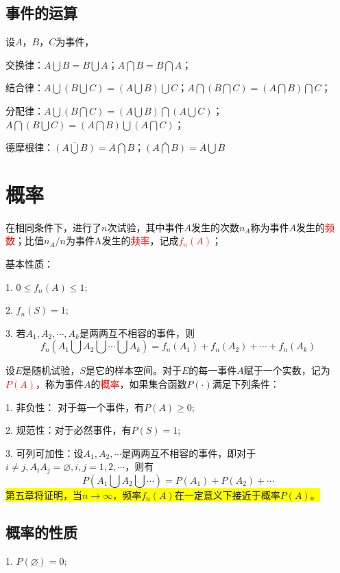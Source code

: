 \documentclass[12pt,a4paper]{article}
\begin{document}
\subsection{事件的运算}
设$A$，$B$，$C$为事件，

交换律：$A\bigcup B = B\bigcup A$；$A\bigcap B = B\bigcap A$；

结合律：$A\bigcup (B \bigcup C) = (A\bigcup B) \bigcup C$；$A\bigcap (B \bigcap C) = (A\bigcap B) \bigcap C$；

分配律：$A\bigcup (B \bigcap C) = (A\bigcup B) \bigcap (A\bigcup C)$；$A\bigcap (B \bigcup C) = (A\bigcap B) \bigcup (A\bigcap C)$；

德摩根律：$\overline{(A\bigcup B)} = \overline{A} \bigcap \overline{B}$；$\overline{(A\bigcap B)} = \overline{A} \bigcup \overline{B}$

\section{概率}

在相同条件下，进行了$n$次试验，其中事件$A$发生的次数$n_A$称为事件$A$发生的\textcolor{red}{频数}；比值$n_A/n$为事件A发生的\textcolor{red}{频率}，记成\textcolor{red}{$f_n(A)$}；

基本性质：

1. $0 \leqslant f_n(A) \leqslant 1$;

2. $f_n(S) = 1$;

3. 若$A_1, A_2, \cdots, A_k$是两两互不相容的事件，则
\begin{equation}
f_n(A_1 \bigcup A_2 \bigcup \cdots \bigcup A_k) = f_n(A_1) + f_n(A_2) + \cdots +f_n(A_k)
\end{equation}

设$E$是随机试验，$S$是它的样本空间。对于$E$的每一事件$A$赋于一个实数，记为\textcolor{red}{$P(A)$}，称为事件$A$的\textcolor{red}{概率}，如果集合函数$P(\cdot)$满足下列条件：

1. 非负性： 对于每一个事件，有$P(A) \geqslant 0$;

2. 规范性：对于必然事件，有$P(S) = 1$;

3. 可列可加性：设$A_1, A_2, \cdots$是两两互不相容的事件，即对于$i \neq j, A_i A_j = \varnothing, i, j = 1, 2, \cdots$，则有
\begin{equation}
P(A_1 \bigcup A_2 \bigcup \cdots) = P(A_1) + P(A_2) + \cdots 
\end{equation}
\colorbox{yellow}{第五章将证明，当$n \rightarrow \infty$，频率$f_n(A)$在一定意义下接近于概率$P(A)$。}

\subsection{概率的性质}
1. $P(\varnothing) = 0$;
\end{document}
